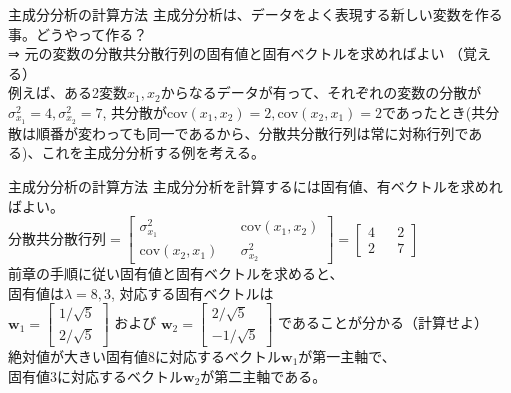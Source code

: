 \documentclass[dvipdfmx,autodetect-engine, unicode, 10pt, aspectratio=169]{beamer}
\begin{document}
\begin{frame}{主成分分析の計算方法}
    主成分分析は、データをよく表現する新しい変数を作る事。どうやって作る？\\
    ⇒ 元の変数の分散共分散行列の固有値と固有ベクトルを求めればよい （覚える）\\
    \vspace{10pt}
    例えば、ある2変数$x_1, x_2$からなるデータが有って、それぞれの変数の分散が$\sigma^2_{x_1}=4, \sigma^2_{x_2}=7$, 共分散が$\text{cov}(x_1, x_2)=2, \text{cov}(x_2, x_1)=2$であったとき(共分散は順番が変わっても同一であるから、分散共分散行列は常に対称行列である)、これを主成分分析する例を考える。
\end{frame}
\begin{frame}{主成分分析の計算方法}    
    主成分分析を計算するには固有値、有ベクトルを求めればよい。 \\
    $
        \text{分散共分散行列} = 
            \begin{bmatrix}
                \sigma^2_{x_1} && \text{cov}(x_1, x_2) \\
                \text{cov}(x_2, x_1) && \sigma^2_{x_2}
            \end{bmatrix} = 
            \begin{bmatrix}
                4 && 2 \\
                2 && 7
            \end{bmatrix}
    $ \\
    前章の手順に従い固有値と固有ベクトルを求めると、\\
    固有値は$\lambda = 8, 3$, 対応する固有ベクトルは\\
    $\bm{w}_1 = \begin{bmatrix}
        1/\sqrt{5} \\ 2/\sqrt{5}
    \end{bmatrix}$
    および
    $\bm{w}_2 = \begin{bmatrix}
        2/\sqrt{5} \\ -1/\sqrt{5}
    \end{bmatrix}$
    であることが分かる（計算せよ）\\
    絶対値が大きい固有値8に対応するベクトル$\bm{w}_1$が第一主軸で、\\
    固有値3に対応するベクトル$\bm{w}_2$が第二主軸である。
\end{frame}
\end{document}
